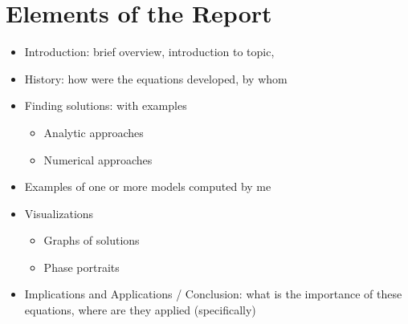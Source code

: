 \documentclass[a4paper,reqno,12pt]{article}
\begin{document}
\section{Elements of the Report}

\begin{itemize}
    \item Introduction: brief overview, introduction to topic, 
    \item History: how were the equations developed, by whom
    \item Finding solutions: with examples
        \begin{itemize}
            \item Analytic approaches
            \item Numerical approaches
        \end{itemize}
    \item Examples of one or more models computed by me
    \item Visualizations
        \begin{itemize}
            \item Graphs of solutions 
            \item Phase portraits 
        \end{itemize}
    \item Implications and Applications / Conclusion: what is the importance of 
        these equations, where are they applied (specifically)
\end{itemize}

\nocite{*}


\end{document}
